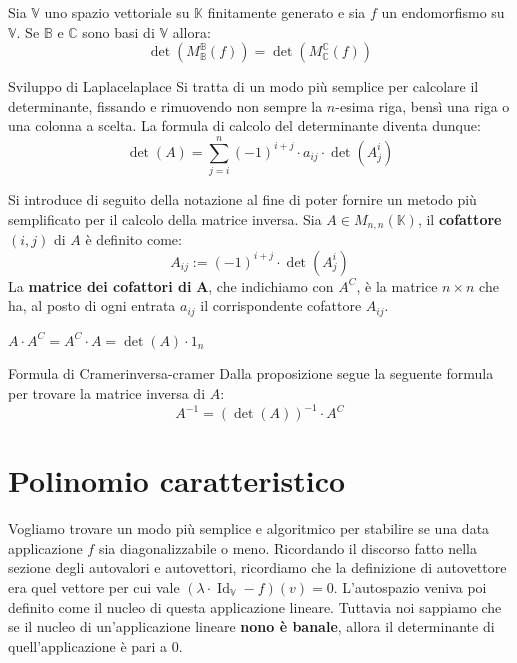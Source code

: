 \documentclass[12pt]{report}
\newcommand{\C}{\mathbb{C}}
\newcommand{\K}{\mathbb{K}}
\newcommand{\V}{\mathbb{V}}
\newcommand{\associatedmatrix}[2]{M^{\mathbb{#1}}_{\mathbb{#2}}}
\begin{document}
	\begin{corollario}{}{}
		Sia $\V$ uno spazio vettoriale su $\K$ finitamente generato e sia $f$ un endomorfismo su $\V$. Se $\mathbb{B}$ e $\C$ sono basi di $\V$ allora:
		\[
			\det(\associatedmatrix{B}{B}(f)) = \det(\associatedmatrix{C}{C}(f))
		\] 
	\end{corollario}
	
	\begin{teorema}{Sviluppo di Laplace}{laplace}
		Si tratta di un modo più semplice per calcolare il determinante, fissando e rimuovendo non sempre la $n$-esima riga, bensì una riga o una colonna a scelta. La formula di calcolo del determinante diventa dunque:
		\[
			\det(A) = \sum_{j=i}^{n} (-1)^{i+j} \cdot a_{ij} \cdot \det(A^{i}_{j})
		\]
	\end{teorema}
	
	Si introduce di seguito della notazione al fine di poter fornire un metodo più semplificato per il calcolo della matrice inversa.
	Sia $A \in M_{n,n}(\K)$, il \textbf{cofattore} $(i, j)$ di $A$ è definito come:
	\[
		A_{ij} := (-1)^{i+j} \cdot \det(A^{i}_{j})
	\]
	La \textbf{matrice dei cofattori di} $\mathbf{A}$, che indichiamo con $A^C$, è la matrice $n \times n$ che ha, al posto di ogni entrata $a_{ij}$ il corrispondente cofattore $A_{ij}$.
	
	\begin{proposizione}{}{}
			$A \cdot A^C = A^C \cdot A = \det(A) \cdot 1_n$
	\end{proposizione}
	
	\begin{teorema}{Formula di Cramer}{inversa-cramer}
		Dalla proposizione segue la seguente formula per trovare la matrice inversa di $A$:
		\[
			A^{-1} = (\det(A))^{-1} \cdot A^C
		\]
	\end{teorema}
	
	\section{Polinomio caratteristico}
	Vogliamo trovare un modo più semplice e algoritmico per stabilire se una data applicazione $f$ sia diagonalizzabile o meno.
	Ricordando il discorso fatto nella sezione degli autovalori e autovettori, ricordiamo che la definizione di autovettore era quel vettore per cui vale $(\lambda \cdot \operatorname{Id}_\V- f)(v) = 0$.
	L'autospazio veniva poi definito come il nucleo di questa applicazione lineare. Tuttavia noi sappiamo che se il nucleo di un'applicazione lineare \textbf{nono è banale}, allora il determinante di quell'applicazione è pari a $0$.
	
\end{document}
